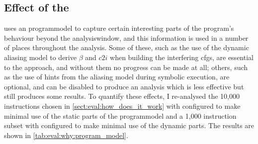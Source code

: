 \subsection{Effect of the }

{\technique} uses an \gls{programmodel} to capture certain interesting
parts of the program's behaviour beyond the \gls{analysiswindow}, and
this information is used in a number of places throughout the
analysis.  Some of these, such as the use of the dynamic aliasing
model to derive $\beta$ and $c2i$ when building the interfering
\glspl{cfg}, are essential to the approach, and without them no
progress can be made at all; others, such as the use of hints from the
aliasing model during symbolic execution, are optional, and can be
disabled to produce an analysis which is less effective but still
produces some results.  To quantify these effects, I re-analysed the
10,000 instructions chosen in \autoref{sect:eval:how_does_it_work}
with {\implementation} configured to make minimal use of the static
parts of the \gls{programmodel} and a 1,000 instruction subset with
{\implementation} configured to make minimal use of the dynamic parts.
The results are shown in \autoref{tab:eval:why:program_model}.

